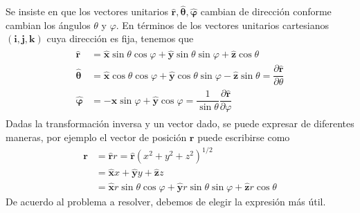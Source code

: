 %
%
Se insiste en que los vectores unitarios $\mathbf{\widehat{r}}, \bm{\widehat{\theta}}, \bm{\widehat{\varphi}}$ cambian de dirección conforme cambian los ángulos $\theta$ y $\varphi$. En términos de los vectores unitarios cartesianos $(\mathbf{i},\mathbf{j},\mathbf{k})$ cuya dirección es fija, tenemos que
\begin{eqnarray}
\begin{aligned}
\mathbf{\widehat{r}} &= \mathbf{\widehat{x}}\sin \theta \cos \varphi + \mathbf{\widehat{y}} \sin \theta \sin \varphi + \mathbf{\widehat{z}} \cos \theta \\
\bm{\widehat{\theta}} &= \mathbf{\widehat{x}}\cos \theta \cos \varphi + \mathbf{\widehat{y}} \cos \theta \sin \varphi - \mathbf{\widehat{z}} \sin \theta = \dfrac{\partial \mathbf{\widehat{r}}}{\partial \theta} \\
\bm{\widehat{\varphi}} &= - \mathbf{\widehat{x}} \sin \varphi + \mathbf{\widehat{y}} \cos \varphi = \dfrac{1}{\sin \theta} \dfrac{\partial \mathbf{\widehat{r}}}{\partial \varphi}
\end{aligned}
\end{eqnarray}
Dadas la transformación inversa y un vector dado, se puede expresar de diferentes maneras, por ejemplo el vector de posición $\mathbf{r}$ puede escribirse como
\[ \begin{split}
\mathbf{r} &= \mathbf{\widehat{r}} r = \mathbf{\widehat{r}} \left( x^{2} + y^{2} + z^{2} \right)^{1/2} \\
&= \mathbf{\widehat{x}} x + \mathbf{\widehat{y}} y + \mathbf{\widehat{z}} z  \\
&= \mathbf{\widehat{x}} r \sin \theta \cos \varphi + \mathbf{\widehat{y}} r \sin \theta \sin \varphi + \mathbf{\widehat{z}} r \cos \theta    
\end{split}\]
De  acuerdo al problema a resolver, debemos de elegir la expresión más útil.

